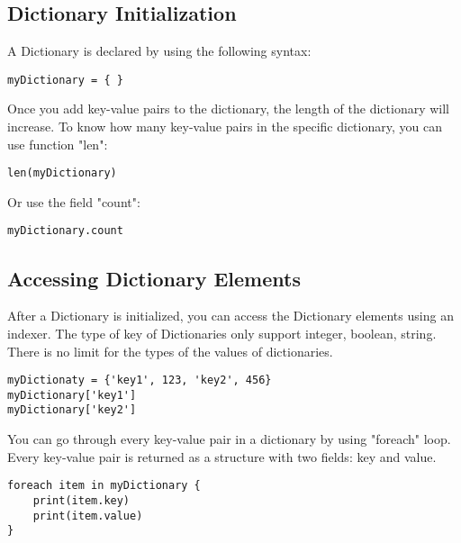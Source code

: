 \subsection{Dictionary Initialization}
A Dictionary is declared by using the following syntax:

\begin{lstlisting}
myDictionary = { }
\end{lstlisting}

Once you add key-value pairs to the dictionary, the length of the dictionary will increase. To know how many key-value pairs in the specific dictionary, you can use function "len":

\begin{lstlisting}
len(myDictionary)
\end{lstlisting}

Or use the field "count":

\begin{lstlisting}
myDictionary.count
\end{lstlisting}

\subsection{Accessing Dictionary Elements}
After a Dictionary is initialized, you can access the Dictionary elements using an indexer. The type of key of Dictionaries only support integer, boolean, string. There is no limit for the types of the values of dictionaries.

\begin{lstlisting}
myDictionaty = {'key1', 123, 'key2', 456}
myDictionary['key1']
myDictionary['key2']
\end{lstlisting}

You can go through every key-value pair in a dictionary by using "foreach" loop. Every key-value pair is returned as a structure with two fields: key and value.

\begin{lstlisting}
foreach item in myDictionary {
	print(item.key)
	print(item.value)
}
\end{lstlisting}

